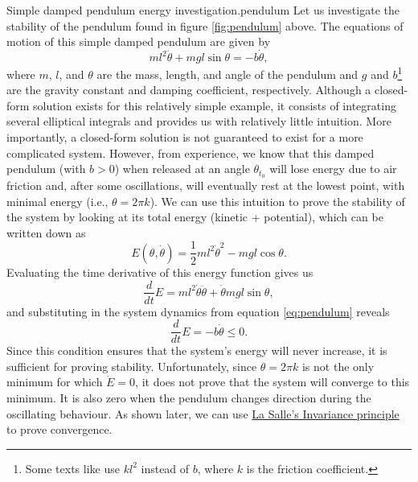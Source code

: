 \begin{example}{Simple damped pendulum energy investigation.}{pendulum}
  Let us investigate the stability of the pendulum found in figure \ref{fig:pendulum} above. The equations of motion of this simple damped pendulum are given by
  \begin{equation} \label{eq:pendulum}
    ml^2\ddot{\theta} + mgl\sin{\theta} = -b\dot{\theta},
  \end{equation}
  where $m$, $l$, and $\theta$ are the mass, length, and angle of the pendulum and $g$ and $b$\footnote{Some texts like \cite{khalilNonlinearControl2015} use $kl^2$ instead of $b$, where $k$ is the friction coefficient.} are the gravity constant and damping coefficient, respectively. Although a closed-form solution exists for this relatively simple example, it consists of integrating several elliptical integrals and provides us with relatively little intuition. More importantly, a closed-form solution is not guaranteed to exist for a more complicated system. However, from experience, we know that this damped pendulum (with $b > 0$) when released at an angle $\theta_{t_0}$ will lose energy due to air friction and, after some oscillations, will eventually rest at the lowest point, with minimal energy (i.e., $\theta = 2\pi k$). We can use this intuition to prove the stability of the system by looking at its total energy (kinetic + potential), which can be written down as
  \begin{equation}
    E\left(\theta, \dot{\theta}\right) = \frac{1}{2}ml^2\dot{\theta}^2 - mgl\cos{\theta}.
  \end{equation}
  Evaluating the time derivative of this energy function gives us
  \begin{equation}
    \frac{d}{dt}E = ml^2\dot{\theta}\ddot{\theta} + \dot{\theta}mgl\sin{\theta},
  \end{equation}
  and substituting in the system dynamics from equation \eqref{eq:pendulum} reveals
  \begin{equation}
    \frac{d}{dt}E = -b\dot{\theta} \le 0.
  \end{equation}
  Since this condition ensures that the system's energy will never increase, it is sufficient for proving stability. Unfortunately, since $\theta = 2\pi k$ is not the only minimum for which $\dot{E} = 0$, it does not prove that the system will converge to this minimum. It is also zero when the pendulum changes direction during the oscillating behaviour. As shown later, we can use \hyperref[th:lasalles]{La Salle's Invariance principle} to prove convergence.
\end{example}

